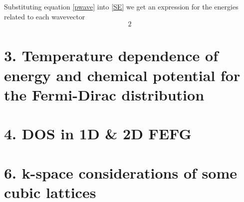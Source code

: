\documentclass{article}
\begin{document}
Substituting equation \eqref{pwave} into \eqref{SE} we get an expression for the energies related to each wavevector
\begin{equation}
 	2
\end{equation} 


\section*{3. Temperature dependence of energy and chemical potential for the Fermi-Dirac distribution}

\section*{4. DOS in 1D \& 2D FEFG}

\section*{ 6. k-space considerations of some cubic lattices }
\end{document}
